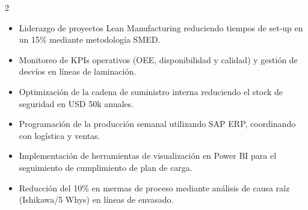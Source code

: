 \documentclass[10pt,a4paper,withhyper]{altacv}
\begin{document}




\makecvheader


\begin{paracol}{2}

\begin{itemize}
\item Liderazgo de proyectos Lean Manufacturing reduciendo tiempos de set-up en un 15\% mediante metodología SMED.
\item Monitoreo de KPIs operativos (OEE, disponibilidad y calidad) y gestión de desvíos en líneas de laminación.
\item Optimización de la cadena de suministro interna reduciendo el stock de seguridad en USD 50k anuales.
\end{itemize}

\divider

\begin{itemize}
\item Programación de la producción semanal utilizando SAP ERP, coordinando con logística y ventas.
\item Implementación de herramientas de visualización en Power BI para el seguimiento de cumplimiento de plan de carga.
\item Reducción del 10\% en mermas de proceso mediante análisis de causa raíz (Ishikawa/5 Whys) en líneas de envasado.
\end{itemize}




\end{paracol}
\end{document}
